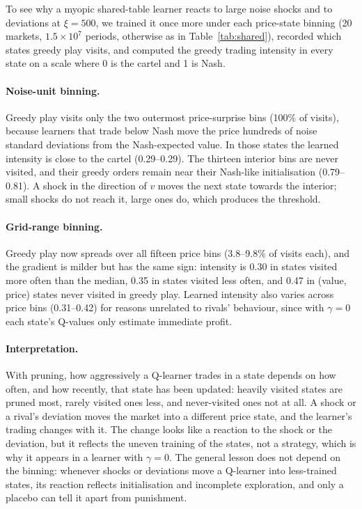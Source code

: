 To see why a myopic shared-table learner reacts to large noise shocks and to
deviations at $\xi=500$, we trained it once more under each price-state
binning (20 markets, $1.5\times10^7$ periods, otherwise as in
Table~\ref{tab:shared}), recorded which states greedy play visits, and
computed the greedy trading intensity in every state on a scale where 0 is the
cartel and 1 is Nash.

\paragraph{Noise-unit binning.} Greedy play visits only the two outermost
price-surprise bins (100\% of visits), because learners that trade below Nash
move the price hundreds of noise standard deviations from the Nash-expected
value. In those states the learned intensity is close to the cartel
(0.29--0.29). The thirteen interior bins are never visited, and their
greedy orders remain near their Nash-like initialisation (0.79--0.81). A
shock in the direction of $v$ moves the next state towards the interior; small
shocks do not reach it, large ones do, which produces the threshold.

\paragraph{Grid-range binning.} Greedy play now spreads over all fifteen
price bins (3.8--9.8\% of visits each), and the gradient is milder but has
the same sign: intensity is 0.30 in states visited more often than the
median, 0.35 in states visited less often, and 0.47 in (value, price) states
never visited in greedy play. Learned intensity also varies across price bins
(0.31--0.42) for reasons unrelated to rivals' behaviour, since with $\gamma=0$
each state's Q-values only estimate immediate profit.

\paragraph{Interpretation.} With pruning, how aggressively a Q-learner trades in
a state depends on how often, and how recently, that state has been updated:
heavily visited states are pruned most, rarely visited ones less, and
never-visited ones not at all. A shock or a rival's deviation moves the market
into a different price state, and the learner's trading changes with it. The
change looks like a reaction to the shock or the deviation, but it reflects
the uneven training of the states, not a strategy, which is why it appears in a
learner with $\gamma=0$. The general lesson does not depend on the binning:
whenever shocks or deviations move a Q-learner into less-trained states, its
reaction reflects initialisation and incomplete exploration, and only a
placebo can tell it apart from punishment.
